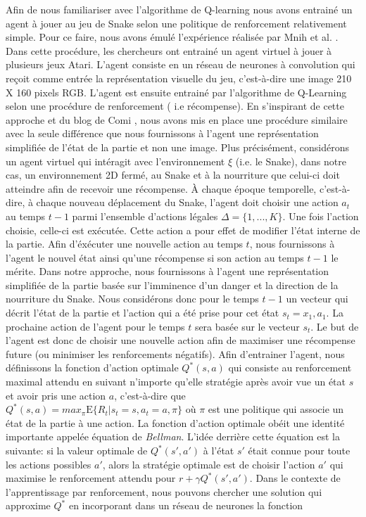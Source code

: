 \documentclass{article}
\begin{document}
Afin de nous familiariser avec l'algorithme de Q-learning nous avons entrainé un agent à jouer au jeu de Snake selon une politique de renforcement relativement simple. Pour ce faire, nous avons émulé l'expérience réalisée par Mnih et al. \cite{DBLP:journals/corr/MnihKSGAWR13}. Dans cette procédure, les chercheurs ont entrainé un agent virtuel à jouer à plusieurs jeux Atari. L'agent consiste en un réseau de neurones à convolution qui reçoit comme entrée la représentation visuelle du jeu, c'est-à-dire une image 210 X 160 pixels RGB. L'agent est ensuite entrainé par l'algorithme de Q-Learning selon une procédure de renforcement ( i.e récompense). En s'inspirant de cette approche et du blog de Comi \cite{comi_2020}, nous avons mis en place une procédure similaire avec la seule différence que nous fournissons à l'agent une représentation simplifiée de l'état de la partie et non une image. Plus précisément, considérons un agent virtuel qui intéragit avec l'environnement $\xi$ (i.e. le Snake), dans notre cas, un environnement 2D fermé, au Snake et à la nourriture que celui-ci doit atteindre afin de recevoir une récompense. À chaque époque temporelle, c'est-à-dire, à chaque nouveau déplacement du Snake, l'agent doit choisir une action $a_t$ au temps $t-1$ parmi l'ensemble d'actions légales $\Delta  = \{1, ..., K\}$. Une fois l'action choisie, celle-ci est exécutée. Cette action a pour effet de modifier l'état interne de la partie. Afin d'éxécuter une nouvelle action au temps $t$, nous fournissons à l'agent le nouvel état ainsi qu'une récompense si son action au temps $t-1$ le mérite. Dans notre approche, nous fournissons à l'agent une représentation simplifiée de la partie basée sur l'imminence d'un danger et la direction de la nourriture du Snake. Nous considérons donc pour le temps $t-1$ un vecteur qui décrit l'état de la partie et l'action qui a été prise pour cet état $s_t = x_{1}, a_{1}$. La prochaine action de l'agent pour le temps $t$ sera basée sur le vecteur $s_t$. Le but de l'agent est donc de choisir une nouvelle action afin de maximiser une récompense future (ou minimiser les renforcements négatifs). Afin d'entrainer l'agent, nous définissons la fonction d'action optimale $Q^*(s,a)$ qui consiste au renforcement maximal attendu en suivant n'importe qu'elle stratégie après avoir vue un état $s$ et avoir pris une action $a$, c'est-à-dire que $Q^*(s,a)= max_\pi 	\mathrm{E} \{R_t | s_t = s, a_{t} = a, \pi\}$ où $\pi$ est une politique qui associe un état de la partie à une action.  La fonction d'action optimale obéit une identité importante appelée équation de \textit{Bellman}. L'idée derrière cette équation est la suivante: si la valeur optimale de $Q^*(s',a')$ à l'état $s'$ était connue pour toute les actions possibles $a'$, alors la stratégie optimale est de choisir l'action $a'$ qui maximise le renforcement attendu pour $r + \gamma Q^*(s',a')$. Dans le contexte de l'apprentissage par renforcement, nous pouvons chercher une solution qui approxime $Q^*$ en incorporant dans un réseau de neurones la fonction 
\end{document}
